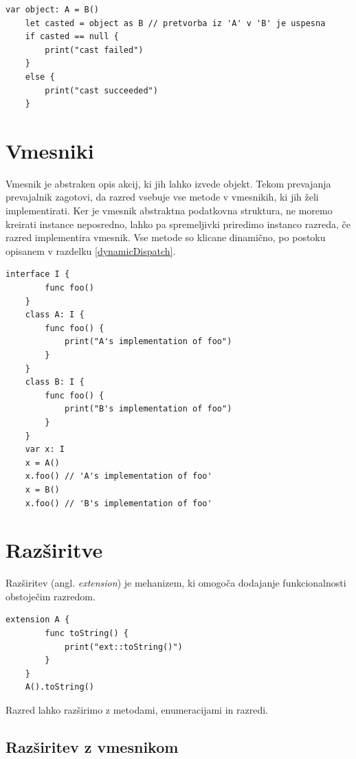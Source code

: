 \documentclass[a4paper, 12pt]{book}
\begin{document}
\begin{lstlisting}[caption={Pretvorba razrede iz sheme ~\ref{vtables}}, captionpos=b]
	var object: A = B()
	let casted = object as B // pretvorba iz 'A' v 'B' je uspesna
	if casted == null {
	    print("cast failed")
	}
	else {
	    print("cast succeeded")
	}
\end{lstlisting}

\section{Vmesniki}

Vmesnik je abstraken opis akcij, ki jih lahko izvede objekt. Tekom prevajanja prevajalnik zagotovi, da razred vsebuje vse metode v vmesnikih, ki jih želi implementirati. Ker je vmesnik abstraktna podatkovna struktura, ne moremo kreirati instance neposredno, lahko pa spremeljivki priredimo instanco razreda, če razred implementira vmesnik. Vse metode so klicane dinamično, po postoku opisanem v razdelku \ref{dynamicDispatch}.

\begin{lstlisting}[caption={Vmesniki}, label={lst:interfaces}, captionpos=b]
	interface I {
	    func foo()
	}
	class A: I {
	    func foo() {
	        print("A's implementation of foo")
	    }
	}
	class B: I {
	    func foo() {
	        print("B's implementation of foo")
	    }
	}
	var x: I
	x = A()
	x.foo() // 'A's implementation of foo'
	x = B()
	x.foo() // 'B's implementation of foo'
\end{lstlisting}

\section{Razširitve}

Razširitev (angl. \textit{extension}) je mehanizem, ki omogoča dodajanje funkcionalnosti obstoječim razredom. 

\begin{lstlisting}[caption={Razširitev razreda A}, captionpos=b]
	extension A {
	    func toString() {
	        print("ext::toString()")
	    }
	}
	A().toString()
\end{lstlisting}

Razred lahko razširimo z metodami, enumeracijami in razredi. 

\subsection{Razširitev z vmesnikom}
\end{document}
